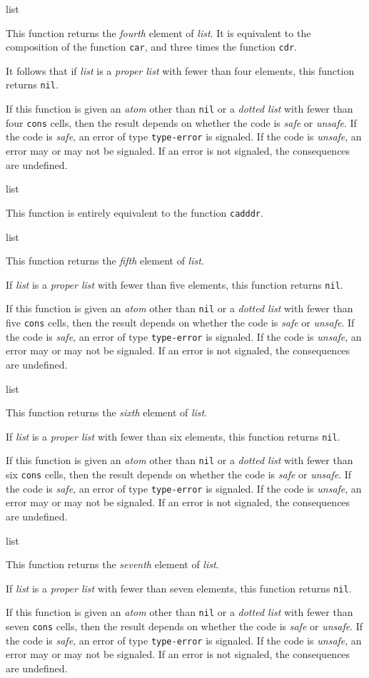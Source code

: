  {list}

This function returns the \emph{fourth} element of \textit{list}.  It
is equivalent to the composition of the function \texttt{car}, and
three times the function \texttt{cdr}.

It follows that if \textit{list} is a \emph{proper list} with fewer
than four elements, this function returns \texttt{nil}.

If this function is given an \emph{atom} other than \texttt{nil} or a
\emph{dotted list} with fewer than four \texttt{cons} cells, then the
result depends on whether the code is \emph{safe} or \emph{unsafe}.
If the code is \emph{safe}, an error of type \texttt{type-error} is
signaled.  If the code is \emph{unsafe}, an error may or may not be
signaled.  If an error is not signaled, the consequences are
undefined.

 {list}

This function is entirely equivalent to the function \texttt{cadddr}. 

 {list}

This function returns the \emph{fifth} element of \textit{list}.

If \textit{list} is a \emph{proper list} with fewer than five
elements, this function returns \texttt{nil}.

If this function is given an \emph{atom} other than \texttt{nil} or a
\emph{dotted list} with fewer than five \texttt{cons} cells, then the
result depends on whether the code is \emph{safe} or \emph{unsafe}.
If the code is \emph{safe}, an error of type \texttt{type-error} is
signaled.  If the code is \emph{unsafe}, an error may or may not be
signaled.  If an error is not signaled, the consequences are
undefined.

 {list}

This function returns the \emph{sixth} element of \textit{list}.

If \textit{list} is a \emph{proper list} with fewer than six
elements, this function returns \texttt{nil}.

If this function is given an \emph{atom} other than \texttt{nil} or a
\emph{dotted list} with fewer than six \texttt{cons} cells, then the
result depends on whether the code is \emph{safe} or \emph{unsafe}.
If the code is \emph{safe}, an error of type \texttt{type-error} is
signaled.  If the code is \emph{unsafe}, an error may or may not be
signaled.  If an error is not signaled, the consequences are
undefined.

 {list}

This function returns the \emph{seventh} element of \textit{list}.

If \textit{list} is a \emph{proper list} with fewer than seven
elements, this function returns \texttt{nil}.

If this function is given an \emph{atom} other than \texttt{nil} or a
\emph{dotted list} with fewer than seven \texttt{cons} cells, then the
result depends on whether the code is \emph{safe} or \emph{unsafe}.
If the code is \emph{safe}, an error of type \texttt{type-error} is
signaled.  If the code is \emph{unsafe}, an error may or may not be
signaled.  If an error is not signaled, the consequences are
undefined.
